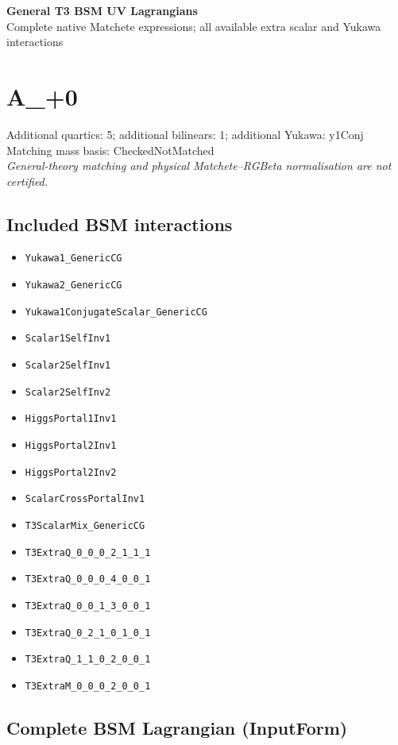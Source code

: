 \documentclass[10pt,a4paper]{article}
\begin{document}
\begin{center}
{\LARGE\bfseries General T3 BSM UV Lagrangians}\\[5pt]
Complete native Matchete expressions; all available extra scalar and Yukawa interactions
\end{center}
\tableofcontents
\clearpage
\clearpage
\section{A\_+0}
Additional quartics: 5; additional bilinears: 1; additional Yukawa: y1Conj\\
Matching mass basis: CheckedNotMatched\\
\emph{General-theory matching and physical Matchete--RGBeta normalisation are not certified.}
\subsection*{Included BSM interactions}
\begin{itemize}
\item \texttt{Yukawa1\_GenericCG}
\item \texttt{Yukawa2\_GenericCG}
\item \texttt{Yukawa1ConjugateScalar\_GenericCG}
\item \texttt{Scalar1SelfInv1}
\item \texttt{Scalar2SelfInv1}
\item \texttt{Scalar2SelfInv2}
\item \texttt{HiggsPortal1Inv1}
\item \texttt{HiggsPortal2Inv1}
\item \texttt{HiggsPortal2Inv2}
\item \texttt{ScalarCrossPortalInv1}
\item \texttt{T3ScalarMix\_GenericCG}
\item \texttt{T3ExtraQ\_0\_0\_0\_2\_1\_1\_1}
\item \texttt{T3ExtraQ\_0\_0\_0\_4\_0\_0\_1}
\item \texttt{T3ExtraQ\_0\_0\_1\_3\_0\_0\_1}
\item \texttt{T3ExtraQ\_0\_2\_1\_0\_1\_0\_1}
\item \texttt{T3ExtraQ\_1\_1\_0\_2\_0\_0\_1}
\item \texttt{T3ExtraM\_0\_0\_0\_2\_0\_0\_1}
\end{itemize}
\subsection*{Complete BSM Lagrangian (InputForm)}

\clearpage
\end{document}
